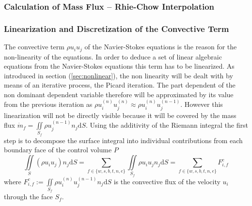       \subsubsection{Calculation of Mass Flux -- Rhie-Chow Interpolation}

      \subsubsection{Linearization and Discretization of the Convective Term}

      The convective term \(\rho u_i u_j\) of the Navier-Stokes equations is the reason for the non-linearity of the equations. In order to deduce a set of linear algebraic equations from the Navier-Stokes equations this term has to be linearized. As introduced in section (\ref{sec:nonlinear}), the non linearity will be dealt with by means of an iterative process, the Picard iteration. The part dependent of the non dominant dependent variable therefore will be approximated by its value from the previous iteration as \( \rho u_i^{(n)} u_j^{(n)} \approx \rho u_i^{(n)} u_j^{(n-1)} \). However this linearization will not be directly visible because it will be covered by the mass flux \(\dot{m}_f = \iint\limits_{S_f} \rho u_j^{(n-1)} n_j \mathrm{d}S \). Using the additivity of the Riemann integral the first step is to decompose the surface integral into individual contributions from each boundary face of the control volume \(P\)
      \begin{displaymath}
      \iint\limits_S (\rho u_i u_j)n_j \mathrm{d}S
      = \sum_{f \in \{w,s,b,t,n,e\}} \iint\limits_{S_f}\rho u_{i} u_{j} n_{j} \mathrm{d}S
      = \sum_{f \in \{w,s,b,t,n,e\}} F_{i,f}^{c}
      \end{displaymath}
      where \(F_{i,f}^c := \iint\limits_{S_f} \rho u_{i}^{(n)} u_{j}^{(n-1)} n_{j} \mathrm{d}S \) is the convective flux of the velocity \(u_i\) through the face \(S_f\). 
      
